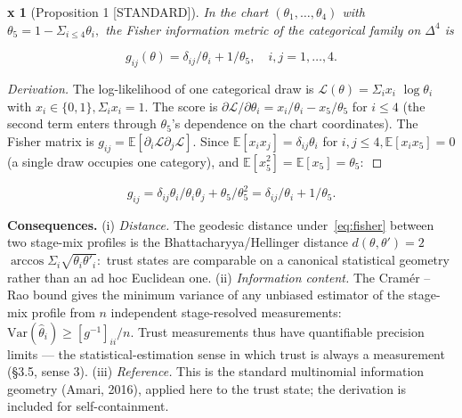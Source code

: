 \documentclass[11pt,twocolumn]{article}
\theoremstyle{gttdef}
\theoremstyle{gttplain}
\newtheorem*{gttplain}{x}
\begin{document}
\begin{gttplain}[{Proposition 1 [STANDARD]}]

In the chart $(\theta_{1}, \ldots, \theta_{4})$ with $\theta_{5} = 1 - \Sigma_{i\leq4} \theta_i,$ the Fisher information metric of the categorical family on $\Delta^{4}$ is

\end{gttplain}

\begin{equation}
g_{ij}(\theta) = \delta_{ij}/\theta_i + 1/\theta_{5}, \quad i, j = 1, \ldots, 4.
\label{eq:fisher}
\end{equation}

\begin{proof}[Derivation]

The log-likelihood of one categorical draw is $\mathcal{L}(\theta) = \Sigma_{i} x_i$ $\log \theta_i$ with $x_i \in \{0, 1\}, \Sigma_{i} x_i = 1.$ The score is $\partial \mathcal{L}/\partial \theta_i = x_i/\theta_i - x_{5}/\theta_{5}$ for $i \leq 4$ (the second term enters through $\theta_{5}$'s dependence on the chart coordinates). The Fisher matrix is $g_{ij} = \mathbb{E}[\partial_i \mathcal{L} \partial_j \mathcal{L}].$ Since $\mathbb{E}[x_i x_j] = \delta_{ij}\theta_i$ for $i, j \leq 4, \mathbb{E}[x_i x_{5}] = 0$ (a single draw occupies one category), and $\mathbb{E}[x_{5}^{2}] = \mathbb{E}[x_{5}] = \theta_{5}:$

\end{proof}

\begin{equation}
g_{ij} = \delta_{ij}\theta_i/\theta_i\theta_j + \theta_{5}/\theta_{5}^{2} = \delta_{ij}/\theta_i + 1/\theta_{5}.
\label{eq:fisherderive}
\end{equation}

\textbf{Consequences.} (i) \emph{Distance.} The geodesic distance under~\eqref{eq:fisher} between two stage-mix profiles is the Bhattacharyya/Hellinger distance $d(\theta, \theta') = 2$ $\arccos \Sigma_{i} \sqrt{\theta_i \theta'_i}:$ trust states are comparable on a canonical statistical geometry rather than an ad hoc Euclidean one. (ii) \emph{Information content.} The Cramér -- Rao bound gives the minimum variance of any unbiased estimator of the stage-mix profile from $n$ independent stage-resolved measurements: $\mathrm{Var}(\hat{\theta}_i) \geq [g^{-1}]_{ii}/n.$ Trust measurements thus have quantifiable precision limits --- the statistical-estimation sense in which trust is always a measurement (\S{}3.5, sense 3). (iii) \emph{Reference.} This is the standard multinomial information geometry (Amari, 2016), applied here to the trust state; the derivation is included for self-containment.
\end{document}
